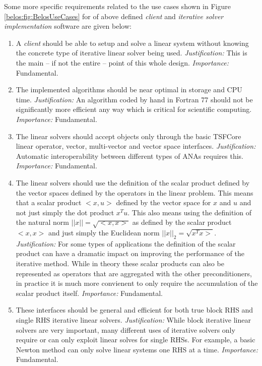 \documentclass[pdf,ps2pdf,11pt]{SANDreport}
\begin{document}
Some more specific requirements related to the use cases shown in
Figure {}\ref{belos:fig:BelosUseCases} for of above defined
{}\textit{client} and {}\textit{iterative solver implementation}
software are given below:

\begin{enumerate}

\item
A {}\textit{client} should be able to setup and solve a linear system
without knowing the concrete type of iterative linear solver being
used.  {}\textit{Justification:} This is the main -- if not the entire
-- point of this whole design.  {}\textit{Importance:} Fundamental.

\item
The implemented algorithms should be near optimal in storage and CPU
time.  {}\textit{Justification:} An algorithm coded by hand in Fortran
77 should not be significantly more efficient any way which is
critical for scientific computing.  {}\textit{Importance:}
Fundamental.

\item
The linear solvers should accept objects only through the basic
TSFCore linear operator, vector, multi-vector and vector space
interfaces.  {}\textit{Justification:} Automatic interoperability
between different types of ANAs requires this.  {}\textit{Importance:}
Fundamental.

\item
The linear solvers should use the definition of the scalar product
defined by the vector spaces defined by the operators in the linear
problem.  This means that a scalar product $<x,u>$ defined by the
vector space for $x$ and $u$ and not just simply the dot product $x^T
u$.  This also means using the definition of the natural norm $||x|| =
\sqrt{<x,x>}$ as defined by the scalar product $<x,x>$ and just simply
the Euclidean norm $||x||_2 = \sqrt{x^T x>}$.
{}\textit{Justification:} For some types of applications the
definition of the scalar product can have a dramatic impact on
improving the performance of the iterative method.  While in theory
these scalar products can also be represented as operators that are
aggregated with the other preconditioners, in practice it is much more
convienent to only require the accumulation of the scalar product
itself.  {}\textit{Importance:} Fundamental.

\item
These interfaces should be general and efficient for both true block
RHS and single RHS iterative linear solvers.
{}\textit{Justification:} While block iterative linear solvers are
very important, many different uses of iterative solvers only require
or can only exploit linear solves for single RHSs.  For example, a
basic Newton method can only solve linear systems one RHS at a time.
{}\textit{Importance:} Fundamental.


\end{enumerate}
\end{document}
